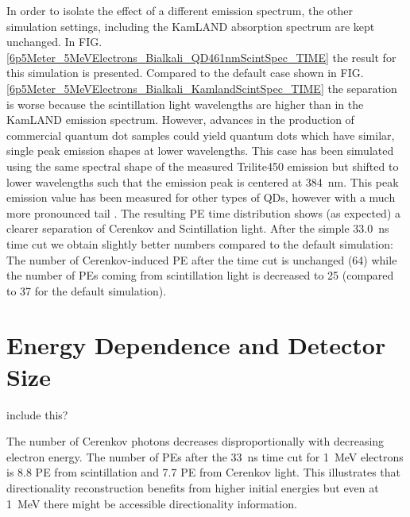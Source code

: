 \documentclass[aps,prc,twocolumn,groupedaddress,showpacs,amsmath,amssymb,floatfix,superscriptaddress]{revtex4}
\begin{document}
In order to isolate the effect of a different emission spectrum, the other simulation settings, including the KamLAND absorption spectrum are kept unchanged. In FIG. \ref{6p5Meter_5MeVElectrons_Bialkali_QD461nmScintSpec_TIME} the result for this simulation is presented. Compared to the default case shown in FIG. \ref{6p5Meter_5MeVElectrons_Bialkali_KamlandScintSpec_TIME} the separation is worse because the scintillation light wavelengths are higher than in the KamLAND emission spectrum. However, advances in the production of commercial quantum dot samples could yield quantum dots which have similar, single peak emission shapes at lower wavelengths. This case has been simulated using the same spectral shape of the measured Trilite450 emission but shifted to lower wavelengths such that the emission peak is centered at 384~nm. This peak emission value has been measured for other types of QDs, however with a much more pronounced tail \cite{tbd}. The resulting PE time distribution shows (as expected) a clearer separation of Cerenkov and Scintillation light. After the simple 33.0~ns time cut we obtain slightly better numbers compared to the default simulation: The number of Cerenkov-induced PE after the time cut is unchanged (64) while the number of PEs coming from scintillation light is decreased to 25 (compared to 37 for the default simulation).  

\section{Energy Dependence and Detector Size}
\label{edep_size_sec}
include this? 

The number of Cerenkov photons decreases disproportionally with decreasing electron energy. The number of PEs after the 33~ns time cut for 1~MeV electrons is 8.8 PE from scintillation and 7.7 PE from Cerenkov light. This illustrates that directionality reconstruction benefits from higher initial energies but even at 1~MeV there might be accessible directionality information.  
\end{document}

